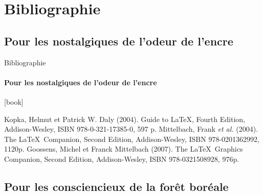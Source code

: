 \scriptsize

\section{Bibliographie}

\subsection*{Pour les nostalgiques de l'odeur de l'encre}

\begin{frame}[c]{Bibliographie}
	\framesubtitle{Pour les nostalgiques de l'odeur de l'encre}
	[book]
		
	\begin{thebibliography}{99}		
			Kopka, Helmut et Patrick W. Daly (2004).
			\newblock Guide to \LaTeX, Fourth Edition,
			\newblock Addison-Wesley,
			\newblock ISBN 978-0-321-17385-0, 597 p.
			Mittelbach, Frank \emph{et al.} (2004).
			\newblock The \LaTeX\ Companion, Second Edition,
			\newblock Addison-Wesley,
			\newblock ISBN 978-0201362992, 1120p.
			Goossens, Michel et Franck Mittelbach (2007).
			\newblock The \LaTeX\ Graphics Companion, Second Edition,
			\newblock Addison-Wesley,
			\newblock ISBN 978-0321508928, 976p.
	\end{thebibliography}

\end{frame}

\subsection*{Pour les consciencieux de la forêt boréale}

